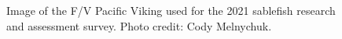 \documentclass[12pt]{article}\usepackage[]{graphicx}\usepackage[]{color}
\begin{document}
\begin{figure}[htb]

{\centering {} 

}

\caption{Image of the F/V Pacific Viking used for the 2021 sablefish research and assessment survey. Photo credit: Cody Melnychuk.}\label{fig:figure2}
\end{figure}
\clearpage
\end{document}
